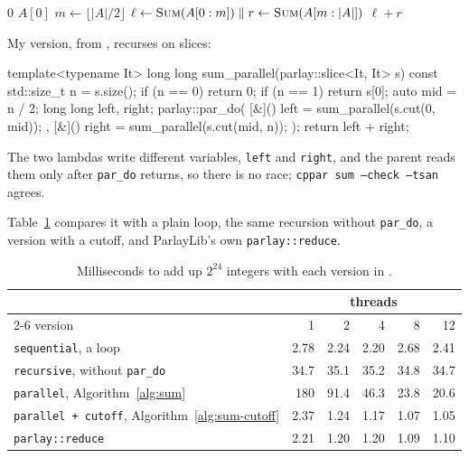 \begin{algorithm}[H]
  \caption{Sum}
  \label{alg:sum}
  \begin{algorithmic}
        \State \Return $0$
      \EndIf
        \State \Return $A[0]$
      \EndIf
      \State $m \gets \lfloor |A| / 2 \rfloor$
      \State $\ell \gets \Call{Sum}{A[0 : m]} \parallel r \gets \Call{Sum}{A[m : |A|]}$
      \State \Return $\ell + r$
    \EndFunction
  \end{algorithmic}
\end{algorithm}

My version, from , recurses on slices:
\begin{code}
template<typename It>
long long sum_parallel(parlay::slice<It, It> s) {
    const std::size_t n = s.size();
    if (n == 0) return 0;
    if (n == 1) return s[0];
    auto mid = n / 2;
    long long left, right;
    parlay::par_do(
        [&]() { left = sum_parallel(s.cut(0, mid)); },
        [&]() { right = sum_parallel(s.cut(mid, n)); }
    );
    return left + right;
}
\end{code}
The two lambdas write different variables, \texttt{left} and \texttt{right}, and the parent reads them only after \texttt{par\_do} returns, so there is no race; \texttt{cppar sum --check --tsan} agrees.

Table~\ref{tab:sum} compares it with a plain loop, the same recursion without \texttt{par\_do}, a version with a cutoff, and ParlayLib's own \texttt{parlay::reduce}.

\begin{table}[ht]
  \centering
  \small
  \caption{Milliseconds to add up $2^{24}$ integers with each version in .}
  \label{tab:sum}
  \begin{tabular}{@{}lrrrrr@{}}
    \toprule
    & \multicolumn{5}{c}{threads} \\
    \cmidrule(l){2-6}
    version & 1 & 2 & 4 & 8 & 12 \\
    \midrule
    \texttt{sequential}, a loop & 2.78 & 2.24 & 2.20 & 2.68 & 2.41 \\
    \texttt{recursive}, without \texttt{par\_do} & 34.7 & 35.1 & 35.2 & 34.8 & 34.7 \\
    \texttt{parallel}, Algorithm~\ref{alg:sum} & 180 & 91.4 & 46.3 & 23.8 & 20.6 \\
    \texttt{parallel + cutoff}, Algorithm~\ref{alg:sum-cutoff} & 2.37 & 1.24 & 1.17 & 1.07 & 1.05 \\
    \texttt{parlay::reduce} & 2.21 & 1.20 & 1.20 & 1.09 & 1.10 \\
    \bottomrule
  \end{tabular}
\end{table}

